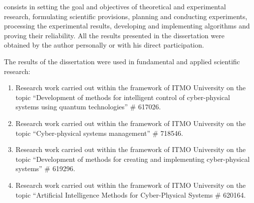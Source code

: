 {\contributionEn} consists in setting the goal and objectives of theoretical and experimental research, formulating scientific provisions, planning and conducting experiments, processing the experimental results, developing and implementing algorithms and proving their reliability. All the results presented in the dissertation were obtained by the author personally or with his direct participation.

{\implementationEn} The results of the dissertation were used in fundamental and applied scientific research:

\begin{enumerate}[beginpenalty=10000]
	\item Research work carried out within the framework of ITMO University on the topic ``Development of methods for intelligent control of cyber-physical systems using quantum technologies'' \# 617026.
	\item Research work carried out within the framework of ITMO University on the topic ``Cyber-physical systems management''  \# 718546.
	\item Research work carried out within the framework of ITMO University on the topic ``Development of methods for creating and implementing cyber-physical systems'' \# 619296.
	\item Research work carried out within the framework of ITMO University on the topic ``Artificial Intelligence Methods for Cyber-Physical Systems \# 620164.
\end{enumerate}


